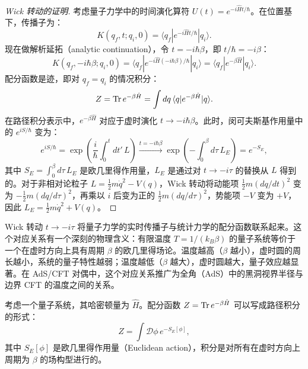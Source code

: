 \begin{proof}[Wick 转动的证明]
考虑量子力学中的时间演化算符 $U(t) = e^{-i\hat{H}t/\hbar}$。在位置基下，传播子为：
\begin{equation}
    K(q_f, t; q_i, 0) = \langle q_f | e^{-i\hat{H}t/\hbar} | q_i \rangle.
\end{equation}
现在做解析延拓（analytic continuation），令 $t = -i\hbar\beta$，即 $t/\hbar = -i\beta$：
\begin{equation}
    K(q_f, -i\hbar\beta; q_i, 0) = \langle q_f | e^{-i\hat{H}(-i\hbar\beta)/\hbar} | q_i \rangle = \langle q_f | e^{-\beta\hat{H}} | q_i \rangle.
\end{equation}
配分函数是迹，即对 $q_f = q_i$ 的情况积分：
\begin{equation}
    Z = \Tr e^{-\beta\hat{H}} = \int dq \, \langle q | e^{-\beta\hat{H}} | q \rangle.
\end{equation}
在路径积分表示中，$e^{-\beta\hat{H}}$ 对应于虚时演化 $t \to -i\hbar\beta$。此时，闵可夫斯基作用量中的 $e^{iS/\hbar}$ 变为：
\begin{equation}
    e^{iS/\hbar} = \exp\left(\frac{i}{\hbar}\int_0^t dt' \, L\right) \xrightarrow{t = -i\hbar\beta} \exp\left(-\int_0^{\beta} d\tau \, L_E\right) = e^{-S_E},
\end{equation}
其中 $S_E = \int_0^{\beta} d\tau \, L_E$ 是欧几里得作用量，$L_E$ 是通过对 $t \to -i\tau$ 的替换从 $L$ 得到的。对于非相对论粒子 $L = \frac{1}{2}m\dot{q}^2 - V(q)$，Wick 转动将动能项 $\frac{1}{2}m(dq/dt)^2$ 变为 $-\frac{1}{2}m(dq/d\tau)^2$，再乘以 $i$ 后变为正的 $\frac{1}{2}m(dq/d\tau)^2$，势能项 $-V$ 变为 $+V$，因此 $L_E = \frac{1}{2}m\dot{q}^2 + V(q)$。
\end{proof}

\begin{remark}
Wick 转动 $t \to -i\tau$ 将量子力学的实时传播子与统计力学的配分函数联系起来。这个对应关系有一个深刻的物理含义：有限温度 $T = 1/(k_B\beta)$ 的量子系统等价于一个在虚时方向上具有周期 $\beta$ 的欧几里得场论。温度越高（$\beta$ 越小），虚时圆的周长越小，系统的量子特性越弱；温度越低（$\beta$ 越大），虚时圆越大，量子效应越显著。在 AdS/CFT 对偶中，这个对应关系推广为全角（AdS）中的黑洞视界半径与边界 CFT 的温度之间的关系\cite{Hawking1983}。
\end{remark}

\begin{theorem}[配分函数的路径积分表示]
考虑一个量子系统，其哈密顿量为 $\hat{H}$。配分函数 $Z = \Tr e^{-\beta \hat{H}}$ 可以写成路径积分的形式：
\begin{equation}
    Z = \int \mathcal{D}\phi \, e^{-S_E[\phi]},
    \label{eq:path_integral_Z}
\end{equation}
其中 $S_E[\phi]$ 是欧几里得作用量（Euclidean action），积分是对所有在虚时方向上周期为 $\beta$ 的场构型进行的。
\end{theorem}

